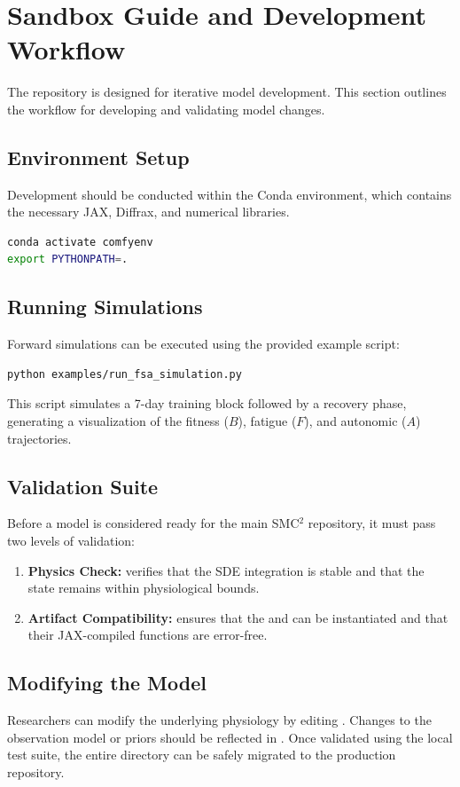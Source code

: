 \section{Sandbox Guide and Development Workflow}

The  repository is designed for iterative model development. This section outlines the workflow for developing and validating model changes.

\subsection{Environment Setup}

Development should be conducted within the  Conda environment, which contains the necessary JAX, Diffrax, and numerical libraries.
\begin{lstlisting}[language=bash]
conda activate comfyenv
export PYTHONPATH=.
\end{lstlisting}

\subsection{Running Simulations}

Forward simulations can be executed using the provided example script:
\begin{lstlisting}[language=bash]
python examples/run_fsa_simulation.py
\end{lstlisting}
This script simulates a 7-day training block followed by a recovery phase, generating a visualization of the fitness (\(B\)), fatigue (\(F\)), and autonomic (\(A\)) trajectories.

\subsection{Validation Suite}

Before a model is considered ready for the main SMC${}^2$ repository, it must pass two levels of validation:
\begin{enumerate}
    \item \textbf{Physics Check:}  verifies that the SDE integration is stable and that the state remains within physiological bounds.
    \item \textbf{Artifact Compatibility:}  ensures that the  and  can be instantiated and that their JAX-compiled functions are error-free.
\end{enumerate}

\subsection{Modifying the Model}

Researchers can modify the underlying physiology by editing . Changes to the observation model or priors should be reflected in . Once validated using the local test suite, the entire  directory can be safely migrated to the production  repository.
